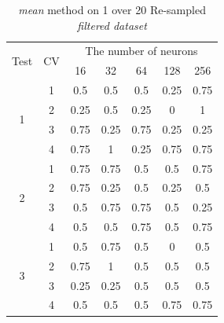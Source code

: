 \documentclass[draft,dvipsnames]{drexel-thesis}
\begin{document}
\begin{thesis}
\begin{table}[!t]
\centering
\caption{{\em mean} method on 1 over 20 Re-sampled {\em filtered dataset}}
\label{tbl:mean_1_20}
\begin{tabular}{|c|c|c|c|c|c|c|}
\hline
\multirow{2}{*}{Test} & \multirow{2}{*}{CV} & \multicolumn{5}{c|}{The number of neurons}                           \\ \cline{3-7}
                      &                     & 16       & 32           & 64           & 128          & 256          \\ \hline
\multirow{4}{*}{1}    & 1                   & 0.5      & 0.5          & 0.5          & 0.25         & 0.75         \\ \cline{2-7}
                      & 2                   & 0.25     & 0.5          & 0.25         & 0            & 1            \\ \cline{2-7}
                      & 3                   & 0.75     & 0.25         & 0.75         & 0.25         & 0.25         \\ \cline{2-7}
                      & 4                   & 0.75     & 1            & 0.25         & 0.75         & 0.75         \\ \hline
\multirow{4}{*}{2}    & 1                   & 0.75     & 0.75         & 0.5          & 0.5          & 0.75         \\ \cline{2-7}
                      & 2                   & 0.75     & 0.25         & 0.5          & 0.25         & 0.5          \\ \cline{2-7}
                      & 3                   & 0.5      & 0.75         & 0.75         & 0.5          & 0.25         \\ \cline{2-7}
                      & 4                   & 0.5      & 0.5          & 0.75         & 0.5          & 0.75         \\ \hline
\multirow{4}{*}{3}    & 1                   & 0.5      & 0.75         & 0.5          & 0            & 0.5          \\ \cline{2-7}
                      & 2                   & 0.75     & 1            & 0.5          & 0.5          & 0.5          \\ \cline{2-7}
                      & 3                   & 0.25     & 0.25         & 0.5          & 0.5          & 0.5          \\ \cline{2-7}
                      & 4                   & 0.5      & 0.5          & 0.5          & 0.75         & 0.75         \\ \hline

\end{tabular}
\end{table}
\end{thesis}
\end{document}
